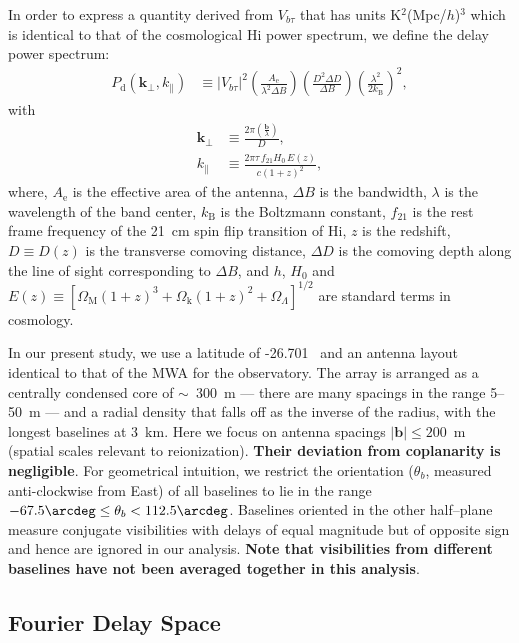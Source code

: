 \documentclass[preprint2,iop,numberedappendix,twocolappendix,appendixfloats]{emulateapj}
\begin{document}
In order to express a quantity derived from $V_{b\tau}$ that has units K$^2$(Mpc/$h$)$^3$ which is identical to that of the cosmological H{\sc i} power spectrum, we define the delay power spectrum:
\begin{align}\label{eqn:delay-power-spectrum}
  P_\textrm{d}(\boldsymbol{k}_\perp,k_\parallel) &\equiv |V_{b\tau}|^2\left(\frac{A_\textrm{e}}{\lambda^2\Delta B}\right)\left(\frac{D^2\Delta D}{\Delta B}\right)\left(\frac{\lambda^2}{2k_\textrm{B}}\right)^2,
\end{align}
with
\begin{align}
  \boldsymbol{k}_\perp &\equiv \frac{2\pi(\frac{\boldsymbol{b}}{\lambda})}{D}, \\
  k_\parallel &\equiv \frac{2\pi\tau\,f_{21}H_0\,E(z)}{c(1+z)^2}, 
\end{align}
where, $A_\textrm{e}$ is the effective area of the antenna, $\Delta B$ is the bandwidth, $\lambda$ is the wavelength of the band center, $k_\textrm{B}$ is the Boltzmann constant, $f_{21}$ is the rest frame frequency of the 21~cm spin flip transition of H{\sc i}, $z$ is the redshift, $D\equiv D(z)$ is the transverse comoving distance, $\Delta D$ is the comoving depth along the line of sight corresponding to $\Delta B$, and $h$, $H_0$ and $E(z)\equiv [\Omega_\textrm{M}(1+z)^3+\Omega_\textrm{k}(1+z)^2+\Omega_\Lambda]^{1/2}$ are standard terms in cosmology.

In our present study, we use a latitude of -26.701\arcdeg~ and an antenna layout identical to that of the MWA \citep{bea12} for the observatory. The array is arranged as a centrally condensed core of $\sim$~300~m --- there are many spacings in the range 5--50~m --- and a radial density that falls off as the inverse of the radius, with the longest baselines at 3~km. Here we focus on antenna spacings $|\boldsymbol{b}| \le 200$~m (spatial scales relevant to reionization). {\bf Their deviation from coplanarity is negligible}. For geometrical intuition, we restrict the orientation ($\theta_b$, measured anti-clockwise from East) of all baselines to lie in the range $-67.5\arcdeg \leq \theta_b < 112.5\arcdeg$. Baselines oriented in the other half--plane measure conjugate visibilities with delays of equal magnitude but of opposite sign and hence are ignored in our analysis. {\bf Note that visibilities from different baselines have not been averaged together in this analysis}. 

\subsection{Fourier Delay Space}\label{sec:delay-space}
\end{document}
